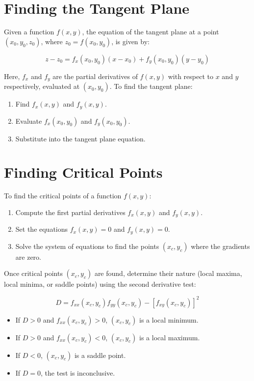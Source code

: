 \section{Finding the Tangent Plane}
Given a function $f(x, y)$, the equation of the tangent plane at a point $(x_0, y_0, z_0)$, where $z_0 = f(x_0, y_0)$, is given by:

\begin{equation}
    z - z_0 = f_x(x_0, y_0)(x - x_0) + f_y(x_0, y_0)(y - y_0)
\end{equation}

\noindent Here, $f_x$ and $f_y$ are the partial derivatives of $f(x, y)$ with respect to $x$ and $y$ respectively, evaluated at $(x_0, y_0)$. To find the tangent plane:

\begin{enumerate}
    \item Find $f_x(x, y)$ and $f_y(x, y)$.
    \item Evaluate $f_x(x_0, y_0)$ and $f_y(x_0, y_0)$.
    \item Substitute into the tangent plane equation.
\end{enumerate}

\section{Finding Critical Points}
To find the critical points of a function $f(x, y)$:

\begin{enumerate}
    \item Compute the first partial derivatives $f_x(x, y)$ and $f_y(x, y)$.
    \item Set the equations $f_x(x, y) = 0$ and $f_y(x, y) = 0$.
    \item Solve the system of equations to find the points $(x_c, y_c)$ where the gradients are zero.
\end{enumerate}

Once critical points $(x_c, y_c)$ are found, determine their nature (local maxima, local minima, or saddle points) using the second derivative test:

\begin{equation}
    D = f_{xx}(x_c, y_c) f_{yy}(x_c, y_c) - [f_{xy}(x_c, y_c)]^2
\end{equation}

\begin{itemize}
    \item If $D > 0$ and $f_{xx}(x_c, y_c) > 0$, $(x_c, y_c)$ is a local minimum.
    \item If $D > 0$ and $f_{xx}(x_c, y_c) < 0$, $(x_c, y_c)$ is a local maximum.
    \item If $D < 0$, $(x_c, y_c)$ is a saddle point.
    \item If $D = 0$, the test is inconclusive.
\end{itemize}

